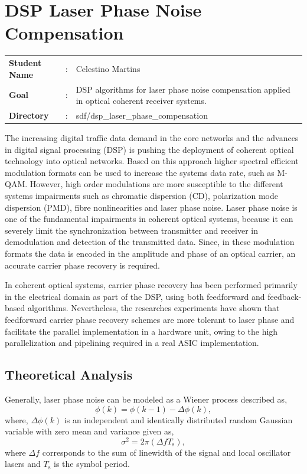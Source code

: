 \clearpage
\section{DSP Laser Phase Noise Compensation}

\begin{tcolorbox}	
\begin{tabular}{p{2.75cm} p{0.2cm} p{10.5cm}} 	
\textbf{Student Name}  &:& Celestino Martins \\
\textbf{Goal}          &:& DSP algorithms for laser phase noise compensation applied in optical coherent receiver systems.\\
\textbf{Directory}              &:& sdf/dsp\_laser\_phase\_compensation
\end{tabular}
\end{tcolorbox}

The increasing digital traffic data demand in the core networks and the advances in digital signal processing (DSP) is pushing the deployment of coherent optical technology into optical networks. Based on this approach higher spectral efficient modulation formats can be used to increase the systems data rate, such as M-QAM. However, high order modulations are more susceptible to the different systems impairments such as chromatic dispersion (CD),
polarization mode dispersion (PMD), fibre nonlinearities and laser phase noise. Laser phase noise is one of the fundamental impairments in coherent optical systems, because it can severely limit the synchronization between transmitter and receiver in demodulation and detection of the transmitted data.
Since, in these modulation formats the data is encoded in the amplitude and phase of an optical carrier, an accurate carrier phase recovery is required.

In coherent optical systems, carrier phase recovery has been performed primarily in the electrical domain as part of the DSP, using both feedforward and feedback-based algorithms. Nevertheless, the researches experiments have shown that feedforward carrier phase recovery schemes are more tolerant to laser phase and facilitate the parallel implementation in a hardware unit, owing to the high parallelization and pipelining required in a real ASIC implementation. 

\subsection{Theoretical Analysis}
Generally, laser phase noise can be modeled as a Wiener process described as,
\begin{equation}
    \phi(k) = \phi(k-1)-\Delta \phi(k),
    \label{eq_phaseNoise}
\end{equation}
where, $\Delta \phi(k)$ is an independent and identically distributed random Gaussian variable with zero mean and variance given as,
\begin{equation}
    	\sigma^{2} = 2\pi(\Delta f T_\mathrm{s}),
    \label{eq_phaseNoise}
\end{equation}
where $\Delta f$ corresponds to the sum of linewidth of the signal and local oscillator lasers and $T_\mathrm{s}$ is the symbol period.

